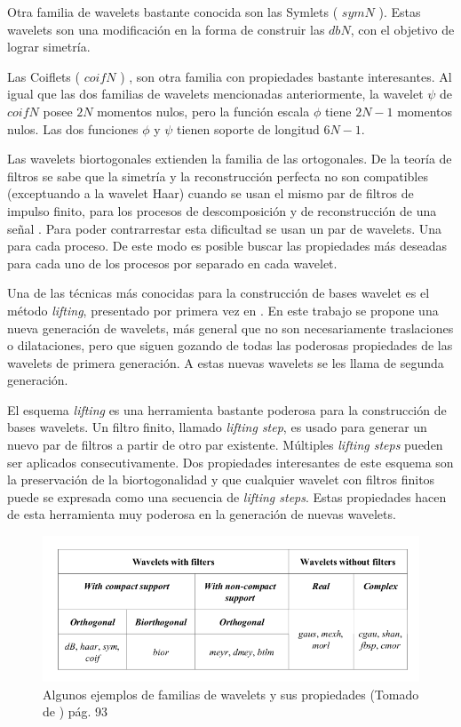 Otra familia de wavelets bastante conocida son las Symlets ( $symN$ ). Estas wavelets son una modificación en la forma
de construir las $dbN$, con el objetivo de lograr simetría.

Las Coiflets ( $coifN$ ) \cite{daubechies1992}, son otra familia con propiedades bastante interesantes. Al igual que las dos familias de 
wavelets mencionadas anteriormente, la wavelet $\psi$ de $coifN$ posee $2N$ momentos nulos, pero la función escala
$\phi$ tiene $2N-1$ momentos nulos. Las dos funciones $\phi$ y $\psi$ tienen soporte de longitud $6N-1$.

Las wavelets biortogonales extienden la familia de las ortogonales. De la teoría de filtros se sabe que
la simetría y la reconstrucción perfecta no son compatibles (exceptuando a la wavelet Haar)
cuando se usan el mismo par de filtros de impulso finito, para los procesos 
de descomposición y de reconstrucción de una señal \cite{misiti2007wavelets}. Para poder contrarrestar esta dificultad se usan un par de
wavelets. Una para cada proceso. De este modo es posible buscar las propiedades más deseadas para cada uno de
los procesos por separado en cada wavelet.

Una de las técnicas más conocidas para la construcción de bases wavelet es el método \textit{lifting}, presentado
por primera vez en \cite{lifting}. En este trabajo se propone una nueva generación de wavelets, más general que no son necesariamente traslaciones 
o dilataciones, pero que siguen gozando de todas las poderosas propiedades de las wavelets de primera generación.
A estas nuevas wavelets se les llama de segunda generación. 

El esquema \textit{lifting} es una herramienta  bastante poderosa para la construcción de bases wavelets. 
Un filtro finito, llamado \textit{lifting step}, es usado para 
generar un nuevo par de filtros a partir de otro par existente. Múltiples \textit{lifting steps} pueden ser aplicados
consecutivamente. Dos propiedades interesantes de este esquema son la preservación de la biortogonalidad
y que cualquier wavelet con filtros finitos puede se expresada como una secuencia de \textit{lifting steps}.
Estas propiedades hacen de esta herramienta muy poderosa en la generación de nuevas wavelets.

\begin{figure}
	\centering
	\includegraphics[scale=0.5]{Graphics/wavelet-properties.png}
	\caption{Algunos ejemplos de familias de wavelets y sus propiedades (Tomado de \cite{misiti2007wavelets}) pág. 93}\label{fig:wavelets-properties}
\end{figure}

